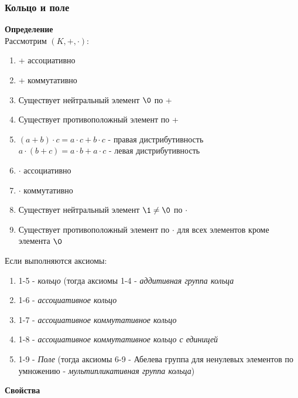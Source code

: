 \documentclass[12pt]{article}
\begin{document}
\subsubsection{Кольцо и поле}
\textbf{Определение}\\
Рассмотрим $(K,+,\cdot)$:
\begin{enumerate}
    \item + ассоциативно
    \item + коммутативно
    \item Существует нейтральный элемент $\0$ по +
    \item Существует противоположный элемент по +
    \item $(a+b)\cdot c=a\cdot c+b\cdot c$ - правая дистрибутивность\\
    $a\cdot (b+c)=a\cdot b+a\cdot c$ - левая дистрибутивность
    \item $\cdot$ ассоциативно
    \item $\cdot$ коммутативно
    \item Существует нейтральный элемент $\1\neq \0$ по $\cdot$
    \item Существует противоположный элемент по $\cdot$ для всех элементов кроме элемента $\0$
\end{enumerate}
Если выполняются аксиомы:
\begin{enumerate}
    \item 1-5 - \textit{кольцо} (тогда аксиомы 1-4 - \textit{аддитивная группа кольца}
    \item 1-6 - \textit{ассоциативное кольцо}
    \item 1-7 - \textit{ассоциативное коммутативное кольцо}
    \item 1-8 - \textit{ассоциативное коммутативное кольцо с единицей}
    \item 1-9 - \textit{Поле} (тогда аксиомы 6-9 - Абелева группа для ненулевых элементов по умножению - \textit{мультипликативная группа кольца})
\end{enumerate}
\textbf{Свойства}
\end{document}
